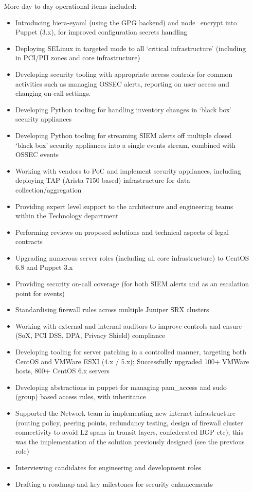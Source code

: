 More day to day operational items included:

\begin{itemize}
\tightlist
\item
  Introducing hiera-eyaml (using the GPG backend) and node\_encrypt into
  Puppet (3.x), for improved configuration secrets handling
\item
  Deploying SELinux in targeted mode to all `critical infrastructure'
  (including in PCI/PII zones and core infrastructure)
\item
  Developing security tooling with appropriate access controls for
  common activities such as managing OSSEC alerts, reporting on user
  access and changing on-call settings.
\item
  Developing Python tooling for handling inventory changes in `black
  box' security appliances
\item
  Developing Python tooling for streaming SIEM alerts off multiple
  closed `black box' security appliances into a single events stream,
  combined with OSSEC events
\item
  Working with vendors to PoC and implement security appliances,
  including deploying TAP (Arista 7150 based) infrastructure for data
  collection/aggregation
\item
  Providing expert level support to the architecture and engineering
  teams within the Technology department
\item
  Performing reviews on proposed solutions and technical aspects of
  legal contracts
\item
  Upgrading numerous server roles (including all core infrastructure) to
  CentOS 6.8 and Puppet 3.x
\item
  Providing security on-call coverage (for both SIEM alerts and as an
  escalation point for events)
\item
  Standardising firewall rules across multiple Juniper SRX clusters
\item
  Working with external and internal auditors to improve controls and
  ensure (SoX, PCI DSS, DPA, Privacy Shield) compliance
\item
  Developing tooling for server patching in a controlled manner,
  targeting both CentOS and VMWare ESXI (4.x / 5.x); Successfully
  upgraded 100+ VMWare hosts, 800+ CentOS 6.x servers
\item
  Developing abstractions in puppet for managing pam\_access and sudo
  (group) based access rules, with inheritance
\item
  Supported the Network team in implementing new internet infrastructure
  (routing policy, peering points, redundancy testing, design of
  firewall cluster connectivity to avoid L2 spans in transit layers,
  confederated BGP etc); this was the implementation of the solution
  previously designed (see the previous role)
\item
  Interviewing candidates for engineering and development roles
\item
  Drafting a roadmap and key milestones for security enhancements
\end{itemize}

